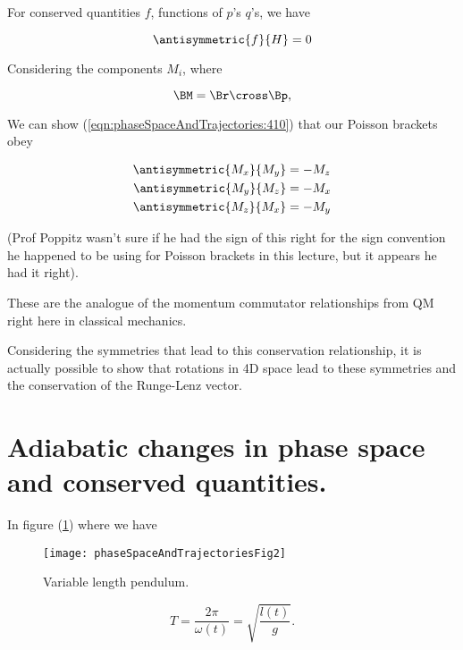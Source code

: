 For conserved quantities $f$, functions of $p$'s $q$'s, we have

\begin{equation}\label{eqn:phaseSpaceAndTrajectories:290}
\antisymmetric{f}{H} = 0
\end{equation}

Considering the components $M_i$, where 

\begin{equation}\label{eqn:phaseSpaceAndTrajectories:310}
\BM = \Br \cross \Bp,
\end{equation}

We can show (\ref{eqn:phaseSpaceAndTrajectories:410}) that our Poisson brackets obey

\begin{align}\label{eqn:phaseSpaceAndTrajectories:330}
\antisymmetric{M_x}{M_y} &= -M_z \\
\antisymmetric{M_y}{M_z} &= -M_x \\
\antisymmetric{M_z}{M_x} &= -M_y
\end{align}

(Prof Poppitz wasn't sure if he had the sign of this right for the sign convention he happened to be using for Poisson brackets in this lecture, but it appears he had it right).

These are the analogue of the momentum commutator relationships from QM right here in classical mechanics.

Considering the symmetries that lead to this conservation relationship, it is actually possible to show that rotations in 4D space lead to these symmetries and the conservation of the Runge-Lenz vector.

\section{Adiabatic changes in phase space and conserved quantities.}

In figure (\ref{fig:phaseSpaceAndTrajectories:phaseSpaceAndTrajectoriesFig2}) where we have

\begin{figure}[htp]
   \centering
   \texttt{[image: phaseSpaceAndTrajectoriesFig2]}
   \caption{Variable length pendulum.}\label{fig:phaseSpaceAndTrajectories:phaseSpaceAndTrajectoriesFig2}
\end{figure}

\begin{equation}\label{eqn:phaseSpaceAndTrajectories:350}
T = \frac{2 \pi}{\omega(t)} = \sqrt{\frac{l(t)}{g}}.
\end{equation}

